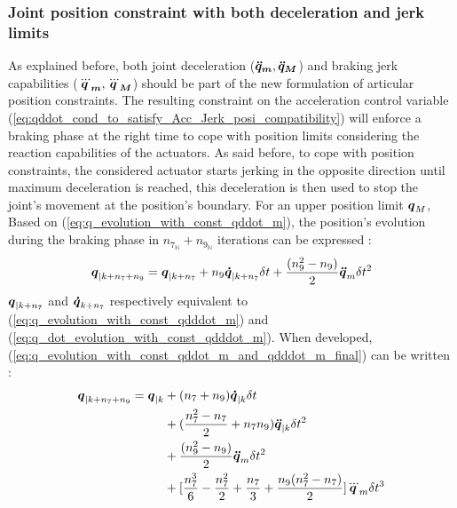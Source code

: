 \documentclass[a4paper, 10pt, conference]{ieeeconf}      %
\newcommand{\vect}[1]{\mbox{\boldmath${#1}$}}%
\begin{document}
{{\subsubsection{Joint position constraint with both deceleration and jerk limits}
As explained before, both joint deceleration ($\vect{\ddot{q}_m}, \vect{\ddot{q}_M}$) and braking jerk capabilities ($\vect{\dddot{q}_m}, \vect{\dddot{q}_M}$) should be part of the new formulation of articular position constraints. The resulting constraint on the acceleration control variable (\ref{eq:qddot_cond_to_satisfy_Acc_Jerk_posi_compatibility}) will enforce a braking phase at the right time to cope with position limits considering the reaction capabilities of the actuators. As said before, to cope with position constraints, the considered actuator starts jerking in the opposite direction until maximum deceleration is reached, this deceleration is then used to stop the joint's movement at the position's boundary. For an upper position limit $\vect{q}_{M}$, Based on (\ref{eq:q_evolution_with_const_qddot_m}), the position's evolution during the braking phase in $n_{7_{\mathbb{N}}}+n_{9_{\mathbb{N}}}$ iterations can be expressed : 
\begin{equation}
\begin{split}
\vect{q}_{|k+n_7+n_9}=\vect{q}_{|k+n_7} + n_9 \vect{\dot{q}}_{|k+n_7} \delta t + \frac{(n_9^2-n_9)}{2} \vect{\ddot{q}}_m \delta t^2
\label{eq:q_evolution_with_const_qddot_m_and_qdddot_m_final}
\end{split}
\end{equation} 
$\vect{q}_{|k+n_7}$ and $\vect{\dot{q}}_{k+n_7}$ respectively equivalent to (\ref{eq:q_evolution_with_const_qdddot_m}) and   (\ref{eq:q_dot_evolution_with_const_qdddot_m}). When developed,
(\ref{eq:q_evolution_with_const_qddot_m_and_qdddot_m_final}) can be written : 
\begin{equation}
\begin{split}
\vect{q}_{|k+n_7+n_9} = \vect{q}_{|k} & + (n_7+n_9) \vect{\dot{q}}_{|k} \delta t \\
                      & + (\frac{n_7^2-n_7}{2}+n_7 n_9) \vect{\ddot{q}}_{|k} \delta t^2 \\
                      & + \frac{(n_9^2-n_9)}{2} \vect{\ddot{q}}_m \delta t^2\\
                      & + [\frac{n_7^3}{6}-\frac{n_7^2}{2}+\frac{n_7}{3}+\frac{n_9(n_7^2-n_7)}  {2}] \vect{\dddot{q}}_m \delta t^3 
                      

\end{split}
\end{equation}}}
\end{document}
